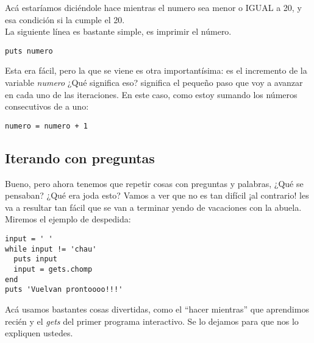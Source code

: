 Acá estaríamos diciéndole hace mientras el numero sea menor o IGUAL a 20, y esa condición si la cumple el 20.\\

La siguiente línea es bastante simple, es imprimir el número.
\begin{lstlisting}
puts numero
\end{lstlisting}

Esta era fácil, pero la que se viene es otra importantísima: es el incremento de la variable \emph{numero} ¿Qué significa eso? significa el pequeño paso que voy a avanzar en cada uno de las iteraciones. En este caso, como estoy sumando los números consecutivos de a uno:
\begin{lstlisting}
numero = numero + 1
\end{lstlisting}

\subsection{Iterando con preguntas}
Bueno, pero ahora tenemos que repetir cosas con preguntas y palabras, ¿Qué se pensaban? ¿Qué era joda esto? Vamos a ver que no es tan difícil ¡al contrario! les va a resultar tan fácil que se van a terminar yendo de vacaciones con la abuela.\\

Miremos el ejemplo de despedida:
\begin{lstlisting}
input = ' '
while input != 'chau'
  puts input
  input = gets.chomp
end
puts 'Vuelvan prontoooo!!!'
\end{lstlisting}

Acá usamos bastantes cosas divertidas, como el “hacer mientras” que aprendimos recién y el \emph{gets} del primer programa interactivo. Se lo dejamos para que nos lo expliquen ustedes.

